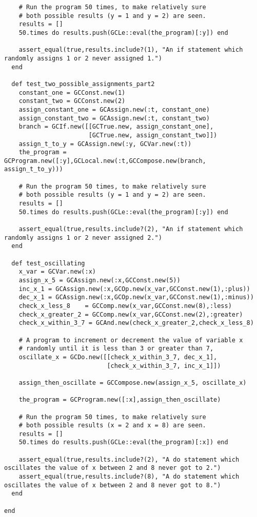 \documentclass[11pt]{article}
\theoremstyle{definition}
\begin{document}
\begin{verbatim}
    # Run the program 50 times, to make relatively sure
    # both possible results (y = 1 and y = 2) are seen.
    results = []
    50.times do results.push(GCLe::eval(the_program)[:y]) end
  
    assert_equal(true,results.include?(1), "An if statement which randomly assigns 1 or 2 never assigned 1.")
  end

  def test_two_possible_assignments_part2
    constant_one = GCConst.new(1)
    constant_two = GCConst.new(2)
    assign_constant_one = GCAssign.new(:t, constant_one)
    assign_constant_two = GCAssign.new(:t, constant_two)
    branch = GCIf.new([[GCTrue.new, assign_constant_one],
                       [GCTrue.new, assign_constant_two]])
    assign_t_to_y = GCAssign.new(:y, GCVar.new(:t))
    the_program = GCProgram.new([:y],GCLocal.new(:t,GCCompose.new(branch, assign_t_to_y)))

    # Run the program 50 times, to make relatively sure
    # both possible results (y = 1 and y = 2) are seen.
    results = []
    50.times do results.push(GCLe::eval(the_program)[:y]) end
  
    assert_equal(true,results.include?(2), "An if statement which randomly assigns 1 or 2 never assigned 2.")
  end
  
  def test_oscillating
    x_var = GCVar.new(:x)
    assign_x_5 = GCAssign.new(:x,GCConst.new(5))
    inc_x_1 = GCAssign.new(:x,GCOp.new(x_var,GCConst.new(1),:plus))
    dec_x_1 = GCAssign.new(:x,GCOp.new(x_var,GCConst.new(1),:minus))
    check_x_less_8    = GCComp.new(x_var,GCConst.new(8),:less)
    check_x_greater_2 = GCComp.new(x_var,GCConst.new(2),:greater)
    check_x_within_3_7 = GCAnd.new(check_x_greater_2,check_x_less_8)
    
    # A program to increment or decrement the value of variable x
    # randomly until it is less than 3 or greater than 7,
    oscillate_x = GCDo.new([[check_x_within_3_7, dec_x_1],
                            [check_x_within_3_7, inc_x_1]])

    assign_then_oscillate = GCCompose.new(assign_x_5, oscillate_x)

    the_program = GCProgram.new([:x],assign_then_oscillate)

    # Run the program 50 times, to make relatively sure
    # both possible results (x = 2 and x = 8) are seen.
    results = []
    50.times do results.push(GCLe::eval(the_program)[:x]) end
  
    assert_equal(true,results.include?(2), "A do statement which oscillates the value of x between 2 and 8 never got to 2.")
    assert_equal(true,results.include?(8), "A do statement which oscillates the value of x between 2 and 8 never got to 8.")
  end

end
\end{verbatim}
\end{document}
